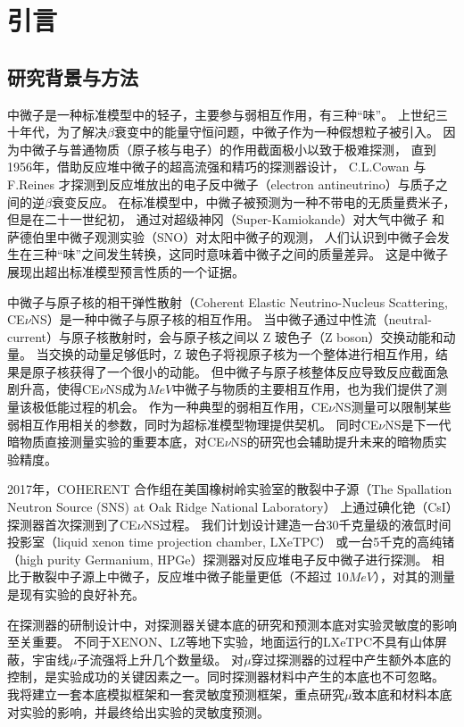 
\chapter{引言}

\section{研究背景与方法}

中微子是一种标准模型中的轻子，主要参与弱相互作用，有三种``味''。
上世纪三十年代，为了解决$\beta$衰变中的能量守恒问题，中微子作为一种假想粒子被引入。
因为中微子与普通物质（原子核与电子）的作用截面极小以致于极难探测，
直到1956年，借助反应堆中微子的超高流强和精巧的探测器设计，
C.L.Cowan 与 F.Reines 才探测到反应堆放出的电子反中微子（electron antineutrino）与质子之间的逆$\beta$衰变反应\cite{cowan_detection_1956}。
在标准模型中，中微子被预测为一种不带电的无质量费米子，但是在二十一世纪初，
通过对超级神冈（Super-Kamiokande）\cite{collaboration_evidence_1998}对大气中微子
和萨德伯里中微子观测实验（SNO）\cite{sno_collaboration_direct_2002}对太阳中微子的观测，
人们认识到中微子会发生在三种``味''之间发生转换，这同时意味着中微子之间的质量差异。
这是中微子展现出超出标准模型预言性质的一个证据。

中微子与原子核的相干弹性散射（Coherent Elastic Neutrino-Nucleus Scattering, CE$\nu$NS）是一种中微子与原子核的相互作用。
当中微子通过中性流（neutral-current）与原子核散射时，会与原子核之间以 Z 玻色子（Z boson）交换动能和动量。
当交换的动量足够低时，Z 玻色子将视原子核为一个整体进行相互作用，结果是原子核获得了一个很小的动能。
但中微子与原子核整体反应导致反应截面急剧升高，使得CE$\nu$NS成为$\si{MeV}$中微子与物质的主要相互作用，也为我们提供了测量该极低能过程的机会。
作为一种典型的弱相互作用，CE$\nu$NS测量可以限制某些弱相互作用相关的参数，同时为超标准模型物理提供契机。
同时CE$\nu$NS是下一代暗物质直接测量实验的重要本底\cite{ohare_fog_2021}，对CE$\nu$NS的研究也会辅助提升未来的暗物质实验精度。

2017年，COHERENT 合作组在美国橡树岭实验室的散裂中子源（The Spallation Neutron Source (SNS) at Oak Ridge National Laboratory）
上通过碘化铯（CsI）探测器首次探测到了CE$\nu$NS过程。
我们计划设计建造一台30千克量级的液氙时间投影室（liquid xenon time projection chamber, LXeTPC）
或一台5千克的高纯锗（high purity Germanium, HPGe）探测器对反应堆电子反中微子进行探测。
相比于散裂中子源上中微子，反应堆中微子能量更低（不超过 10$\si{MeV}$），对其的测量是现有实验的良好补充。

在探测器的研制设计中，对探测器关键本底的研究和预测本底对实验灵敏度的影响至关重要。
不同于XENON、LZ等地下实验，地面运行的LXeTPC不具有山体屏蔽，宇宙线$\mu$子流强将上升几个数量级。
对$\mu$穿过探测器的过程中产生额外本底的控制，是实验成功的关键因素之一。同时探测器材料中产生的本底也不可忽略。
我将建立一套本底模拟框架和一套灵敏度预测框架，重点研究$\mu$致本底和材料本底对实验的影响，并最终给出实验的灵敏度预测。

